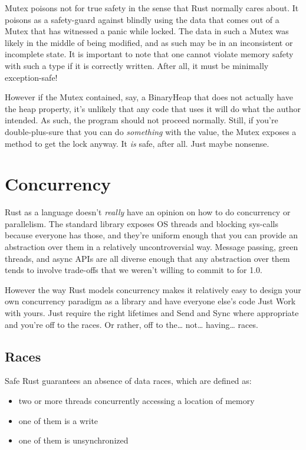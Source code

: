 \documentclass[a4paper,]{book}
\renewcommand*{\hypertarget}[3][\ar]{%
  \def\ar{#2}%
  \label{#1}%
  #3}
\providecommand{\tightlist}{%
  \setlength{\itemsep}{0pt}\setlength{\parskip}{0pt}}
\begin{document}
Mutex poisons not for true safety in the sense that Rust normally cares
about. It poisons as a safety-guard against blindly using the data that
comes out of a Mutex that has witnessed a panic while locked. The data
in such a Mutex was likely in the middle of being modified, and as such
may be in an inconsistent or incomplete state. It is important to note
that one cannot violate memory safety with such a type if it is
correctly written. After all, it must be minimally exception-safe!

However if the Mutex contained, say, a BinaryHeap that does not actually
have the heap property, it's unlikely that any code that uses it will do
what the author intended. As such, the program should not proceed
normally. Still, if you're double-plus-sure that you can do
\emph{something} with the value, the Mutex exposes a method to get the
lock anyway. It \emph{is} safe, after all. Just maybe nonsense.

\chapter{Concurrency}\label{sec--concurrency}

Rust as a language doesn't \emph{really} have an opinion on how to do
concurrency or parallelism. The standard library exposes OS threads and
blocking sys-calls because everyone has those, and they're uniform
enough that you can provide an abstraction over them in a relatively
uncontroversial way. Message passing, green threads, and async APIs are
all diverse enough that any abstraction over them tends to involve
trade-offs that we weren't willing to commit to for 1.0.

However the way Rust models concurrency makes it relatively easy to
design your own concurrency paradigm as a library and have everyone
else's code Just Work with yours. Just require the right lifetimes and
Send and Sync where appropriate and you're off to the races. Or rather,
off to the\ldots{} not\ldots{} having\ldots{} races.

\hypertarget{sec--races}{\section{Races}\label{sec--races}}

Safe Rust guarantees an absence of data races, which are defined as:

\begin{itemize}
\tightlist
\item
  two or more threads concurrently accessing a location of memory
\item
  one of them is a write
\item
  one of them is unsynchronized
\end{itemize}
\end{document}
